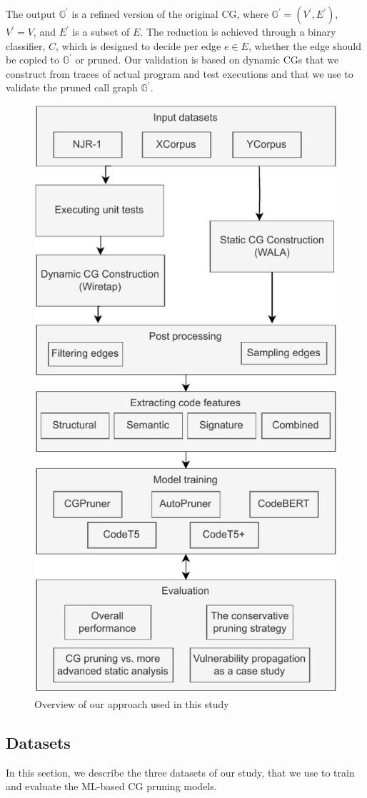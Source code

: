The output $\mathbb{G}^\prime$ is a refined version of the original CG, where $\mathbb{G}^\prime = (V^\prime, E^\prime)$, $V^\prime=V$, and $E^\prime$ is a subset of $E$.
The reduction is achieved through a binary classifier, $C$, which is designed to decide per edge $e \in E$, whether the edge should be copied to $\mathbb{G}^\prime$ or pruned.
Our validation is based on dynamic CGs that we construct from traces of actual program and test executions and that we use to validate the pruned call graph $\mathbb{G}^\prime$.

\begin{figure}[!t]
 \centering
 \includegraphics[width=.4\linewidth]{chapters/ch1/figs/overall-study.pdf}
 \caption{Overview of our approach used in this study}
 \label{fig:overall}
\end{figure}

\subsection{Datasets}\label{subsec:datasets}
In this section, we describe the three datasets of our study, that we use to train and evaluate the ML-based CG pruning models.

